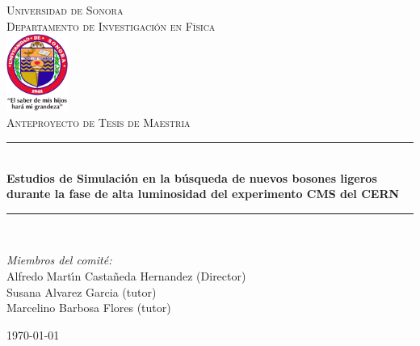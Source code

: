 \newcommand{\HRule}{\rule{\linewidth}{0.5mm}} 

\begin{titlepage}
\center
\textsc{
\Huge{Universidad de Sonora}\\[.5cm]
\Large
Departamento de Investigaci\'on en F\'{\i}sica\\[1cm] 
\includegraphics[width=2cm]{unison}\\[3cm]
Anteproyecto de Tesis de Maestria}\\[.7cm] 

\sffamily
\HRule \\[0.4cm]
\textbf{\LARGE Estudios de Simulaci\'on en la b\'usqueda de nuevos bosones ligeros durante la fase de alta luminosidad del experimento CMS del CERN}\\[0.2cm] 
\HRule \\[3cm]
 
\large
\begin{minipage}[t]{.6\textwidth}
\begin{flushleft}
\emph{Miembros del comit\'e:}
\\
Alfredo Mart\'{\i}n Casta\~neda Hernandez (Director)\\
Susana Alvarez Garcia (tutor)\\
Marcelino Barbosa Flores (tutor)\\
\end{flushleft}

\end{minipage}\hfill




{\today}\\[3cm]

\end{titlepage}


